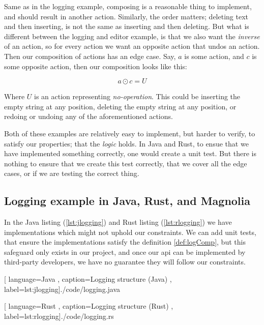 Same as in the logging example, composing is a reasonable thing to implement,
and should result in another action. Similarly, the order matters; deleting text
and then inserting, is not the same as inserting and then deleting. But what is
different between the logging and editor example, is that we also want the
\textit{inverse} of an action, so for every action we want an opposite action
that undos an action. Then our composition of actions has an edge case. Say, $a$
is some action, and $c$ is some opposite action, then our composition looks like
this:

\begin{definition} \label{def:actComp}
  \begin{equation}
    a \odot c = U
  \end{equation}
\end{definition}

Where $U$ is an action representing \textit{no-operation}. This could be
inserting the empty string at any position, deleting the empty string at any
position, or redoing or undoing any of the aforementioned actions.

Both of these examples are relatively easy to implement, but harder to verify,
to satisfy our properties; that the \textit{logic} holds. In Java and Rust, to
ensue that we have implemented something correctly, one would create a unit
test. But there is nothing to ensure that we create this test correctly, that
we cover all the edge cases, or if we are testing the correct thing.

\subsection{Logging example in Java, Rust, and Magnolia}

In the Java listing (\ref{lst:jlogging}) and Rust listing (\ref{lst:rlogging})
we have implementations which might not uphold our constraints. We can add unit
tests, that ensure the implementations satisfy the definition \ref{def:logComp},
but this safeguard only exists in our project, and once our \gls{api} can be
implemented by third-party developers, we have no guarantee they will follow our
constraints.

\begin{center}
  
    [ language=Java
    , caption={Logging structure (Java)}
    , label=lst:jlogging]{./code/logging.java}
\end{center}

\begin{center}
  
    [ language=Rust
    , caption={Logging structure (Rust)}
    , label=lst:rlogging]{./code/logging.rs}
\end{center}

